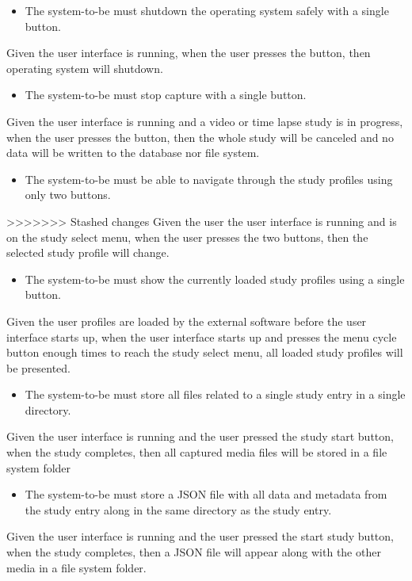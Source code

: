 \begin{itemize}
	\item The system-to-be must shutdown the operating system safely with a single button.
\end{itemize}
Given the user interface is running, when the user presses the button, then operating system will shutdown.
\begin{itemize}
	\item The system-to-be must stop capture with a single button.
\end{itemize}
Given the user interface is running and a video or time lapse study is in progress, when the user presses the button, then the whole study will be canceled and no data will be written to the database nor file system.
\begin{itemize}
	\item The system-to-be must be able to navigate through the study profiles using only two buttons.
\end{itemize}
>>>>>>> Stashed changes
Given the user the user interface is running and is on the study select menu, when the user presses the two buttons, then the selected study profile will change.
\begin{itemize}
	\item The system-to-be must show the currently loaded study profiles using a single button.
\end{itemize}
Given the user profiles are loaded by the external software before the user interface starts up, when the user interface starts up and presses the menu cycle button enough times to reach the study select menu, all loaded study profiles will be presented.
\begin{itemize}
	\item The system-to-be must store all files related to a single study entry in a single directory.
\end{itemize}
Given the user interface is running and the user pressed the study start button, when the study completes, then all captured media files will be stored in a file system folder
\begin{itemize}
	\item The system-to-be must store a JSON file with all data and metadata from the study entry along in the same directory as the study entry.
\end{itemize}
Given the user interface is running and the user pressed the start study button, when the study completes, then a JSON file will appear along with the other media in a file system folder.
